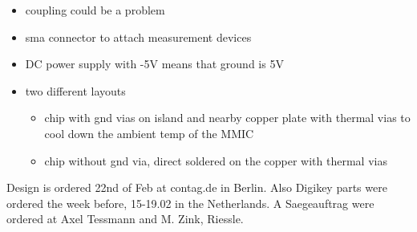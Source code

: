 \begin{itemize}
	\item coupling could be a problem
	\item sma connector to attach measurement devices
	\item DC power supply with -5V means that ground is 5V
	\item two different layouts
	\begin{itemize}
		\item chip with gnd vias on island and nearby copper plate with thermal vias to cool down the ambient temp of the MMIC
		\item chip without gnd via, direct soldered on the copper with thermal vias
	\end{itemize}
\end{itemize}

Design is ordered 22nd of Feb at contag.de in Berlin.
Also Digikey parts were ordered the week before, 15-19.02 in the Netherlands. A Saegeauftrag were ordered at Axel Tessmann and M. Zink, Riessle. 